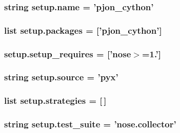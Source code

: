 \hypertarget{namespacesetup_a61de3710bf6c9d78c0afa352263f8b09}{
\subsubsection[{name}]{\setlength{\rightskip}{0pt plus 5cm}string setup.\-name = 'pjon\-\_\-cython'}}\label{namespacesetup_a61de3710bf6c9d78c0afa352263f8b09}
\hypertarget{namespacesetup_aada4406eeab94f62c5f72fee617f0b82}{
\subsubsection[{packages}]{\setlength{\rightskip}{0pt plus 5cm}list setup.\-packages = \mbox{[}'pjon\-\_\-cython'\mbox{]}}}\label{namespacesetup_aada4406eeab94f62c5f72fee617f0b82}
\hypertarget{namespacesetup_a2367b2951475f615fb78d9b5d9d07e50}{
\subsubsection[{setup\-\_\-requires}]{\setlength{\rightskip}{0pt plus 5cm}setup.\-setup\-\_\-requires = \mbox{[}'nose$>$=1.'\mbox{]}}}\label{namespacesetup_a2367b2951475f615fb78d9b5d9d07e50}
\hypertarget{namespacesetup_a64ef73cb876c3cf5d8347c1b19706a94}{
\subsubsection[{source}]{\setlength{\rightskip}{0pt plus 5cm}string setup.\-source = 'pyx'}}\label{namespacesetup_a64ef73cb876c3cf5d8347c1b19706a94}
\hypertarget{namespacesetup_abddc983647e6cd39a723494905437b5f}{
\subsubsection[{strategies}]{\setlength{\rightskip}{0pt plus 5cm}list setup.\-strategies = \mbox{[}$\,$\mbox{]}}}\label{namespacesetup_abddc983647e6cd39a723494905437b5f}
\hypertarget{namespacesetup_aaedcd7e0bf209e42aef838657a6bba4a}{
\subsubsection[{test\-\_\-suite}]{\setlength{\rightskip}{0pt plus 5cm}string setup.\-test\-\_\-suite = 'nose.\-collector'}}\label{namespacesetup_aaedcd7e0bf209e42aef838657a6bba4a}
